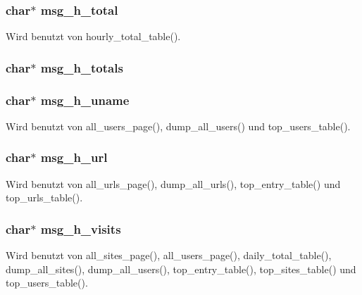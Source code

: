 \subsubsection{\setlength{\rightskip}{0pt plus 5cm}char$\ast$ {\bf msg\_\-h\_\-total}}\label{lang_8h_55b57954b9d1fe93bc7ddd126a839db0}




Wird benutzt von hourly\_\-total\_\-table().
\subsubsection{\setlength{\rightskip}{0pt plus 5cm}char$\ast$ {\bf msg\_\-h\_\-totals}}\label{lang_8h_dafe58551b800a16ddc8b3111529262f}


\subsubsection{\setlength{\rightskip}{0pt plus 5cm}char$\ast$ {\bf msg\_\-h\_\-uname}}\label{lang_8h_04b9008a2c6d6752de424ad84772f803}




Wird benutzt von all\_\-users\_\-page(), dump\_\-all\_\-users() und top\_\-users\_\-table().
\subsubsection{\setlength{\rightskip}{0pt plus 5cm}char$\ast$ {\bf msg\_\-h\_\-url}}\label{lang_8h_c2422ae6f0a2e8bdc0caa4fc75645f4b}




Wird benutzt von all\_\-urls\_\-page(), dump\_\-all\_\-urls(), top\_\-entry\_\-table() und top\_\-urls\_\-table().
\subsubsection{\setlength{\rightskip}{0pt plus 5cm}char$\ast$ {\bf msg\_\-h\_\-visits}}\label{lang_8h_daf199b209b9dd7996804b6018b8539f}




Wird benutzt von all\_\-sites\_\-page(), all\_\-users\_\-page(), daily\_\-total\_\-table(), dump\_\-all\_\-sites(), dump\_\-all\_\-users(), top\_\-entry\_\-table(), top\_\-sites\_\-table() und top\_\-users\_\-table().
